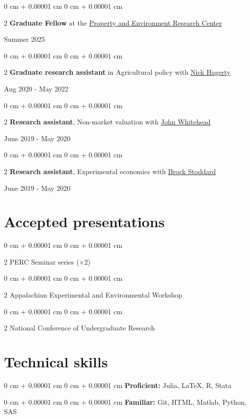 \documentclass[11pt]{article}
\newenvironment{onecolentry}{
	\begin{adjustwidth}{
			0 cm + 0.00001 cm
		}{
			0 cm + 0.00001 cm
		}
	}{
	\end{adjustwidth}
} %
\newenvironment{twocolentry}[2][]{
	\onecolentry
	\def\secondColumn{#2}
	\setcolumnwidth{\fill, 4.5 cm}
	\begin{paracol}{2}
	}{
		\switchcolumn \raggedleft \secondColumn
	\end{paracol}
	\endonecolentry
} %
\begin{document}
\begin{twocolentry}{Summer 2025}\footnotesize
	\textbf{Graduate Fellow} at the \href{https://perc.org/people/willard-robinson/}{Property and Environment Research Center}
\end{twocolentry}

\begin{twocolentry}{Aug 2020 - May 2022}\footnotesize
	\textbf{Graduate research assistant} in	Agricultural policy with \href{https://www.nickhagerty.com/}{Nick Hagerty}
\end{twocolentry}

\begin{twocolentry}{June 2019 - May 2020}\footnotesize
	\textbf{Research assistant},
	Non-market valuation with \href{https://economics.appstate.edu/directory/john-whitehead-phd}{John Whitehead}
\end{twocolentry}

\begin{twocolentry}{June 2019 - May 2020}\footnotesize
	\textbf{Research assistant},
	Experimental economics with \href{https://sites.google.com/a/appstate.edu/brock_stoddard/home}{Brock Stoddard}
\end{twocolentry}


\section{Accepted presentations}

\begin{twocolentry}{2025}\footnotesize
	PERC Seminar series ($\times$2)
\end{twocolentry}
\begin{twocolentry}{2024}\footnotesize
	Appalachian Experimental and Environmental Workshop
\end{twocolentry}
\begin{twocolentry}{2020}\footnotesize
	National Conference of Undergraduate Research
\end{twocolentry}


\section{Technical skills}


\begin{onecolentry}\footnotesize
	\textbf{Proficient:} Julia, \LaTeX, R, Stata
\end{onecolentry}
\begin{onecolentry}\footnotesize
	\textbf{Familiar:} Git, HTML, Matlab, Python, SAS
\end{onecolentry}
\end{document}
